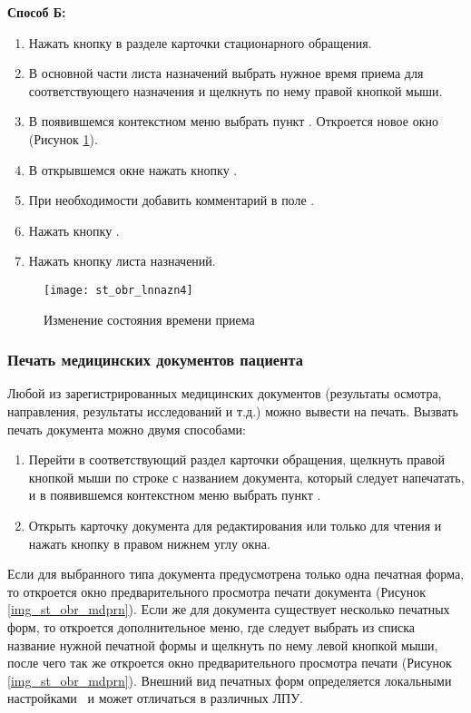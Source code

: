 \textbf{Способ Б:}
\begin{enumerate}
 \item Нажать кнопку  в разделе  карточки стационарного обращения.
 \item В основной части листа назначений выбрать нужное время приема для соответствующего назначения и щелкнуть по нему правой кнопкой мыши.
 \item В появившемся контекстном меню выбрать пункт . Откроется новое окно (Рисунок \ref{img_st_obr_lnnazn4}).
 \item В открывшемся окне нажать кнопку .
 \item При необходимости добавить комментарий в поле .
 \item Нажать кнопку .
 \item Нажать кнопку  листа назначений.
\end{enumerate}

\begin{figure}[ht]\centering
   \texttt{[image: st\_obr\_lnnazn4]}
   \caption{Изменение состояния времени приема}
   \label{img_st_obr_lnnazn4}
\end{figure} 

\subsubsection{Печать медицинских документов пациента}

Любой из зарегистрированных медицинских документов (результаты осмотра, направления, результаты исследований и т.д.) можно вывести на печать. Вызвать печать документа можно двумя способами:
\begin{enumerate}
 \item Перейти в соответствующий раздел карточки обращения, щелкнуть правой кнопкой мыши по строке с названием документа, который следует напечатать, и в появившемся контекстном меню выбрать пункт .
 \item Открыть карточку документа для редактирования или только для чтения и нажать кнопку   в правом нижнем углу окна.
\end{enumerate}
 
Если для выбранного типа документа предусмотрена только одна печатная форма, то откроется окно предварительного просмотра печати документа (Рисунок \ref{img_st_obr_mdprn}). Если же для документа существует несколько печатных форм, то откроется дополнительное меню, где следует выбрать из списка название нужной печатной формы и щелкнуть по нему левой кнопкой мыши, после чего так же откроется окно предварительного просмотра печати (Рисунок \ref{img_st_obr_mdprn}). Внешний вид печатных форм определяется локальными настройками \tmis~и может отличаться в различных ЛПУ.

